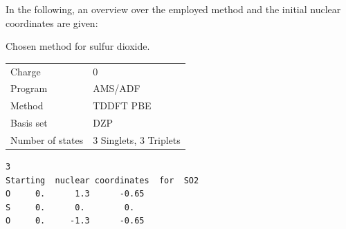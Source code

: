 \documentclass[a4paper,11pt,DIV=15,openany]{scrbook}
\newenvironment{example}{
  \vspace{0mm}
  \definecolor{shadecolor}{HTML}{E4F4FF}
  \begin{shaded}
}{
  \end{shaded}
}
\begin{document}
In the following, an overview over the employed method and the initial nuclear coordinates are given:

\begin{example}
\begin{minipage}{0.45\textwidth}
  \centering
  Chosen method for sulfur dioxide.
  \begin{tabular}{ll}
    \toprule
    Charge              &0\\
    Program             &\textsc{AMS/ADF}\\
    Method              &TDDFT PBE\\
    Basis set           &DZP\\
    Number of states    &3 Singlets, 3 Triplets\\
    \bottomrule
  \end{tabular}
\end{minipage}
\hfill
\begin{minipage}{0.45\textwidth}
  \begin{verbatim}
3
Starting  nuclear coordinates  for  SO2
O     0.      1.3      -0.65
S     0.      0.        0.
O     0.     -1.3      -0.65 
\end{verbatim}
\end{minipage}
\end{example}
\end{document}
